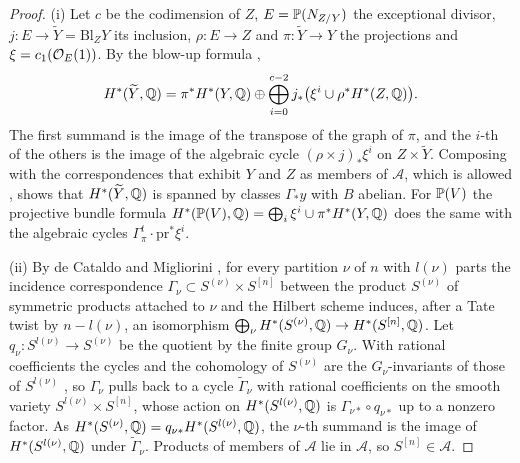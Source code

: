 \begin{proof}
(i) Let $c$ be the codimension of $Z$, $E=\mathbb{P}(N_{Z/Y})$ the exceptional
divisor, $j\colon E\to\widetilde Y=\mathrm{Bl}_{Z}Y$ its inclusion,
$\rho\colon E\to Z$ and $\pi\colon\widetilde Y\to Y$ the projections and
$\xi=c_{1}(\mathcal{O}_{E}(1))$. By the blow-up formula \cite[\S7.3.3]{Voi02},
\[
  H^{*}(\widetilde Y,\mathbb{Q})=\pi^{*}H^{*}(Y,\mathbb{Q})\oplus
  \bigoplus_{i=0}^{c-2}j_{*}\bigl(\xi^{i}\cup\rho^{*}H^{*}(Z,\mathbb{Q})\bigr).
\]
The first summand is the image of the transpose of the graph of $\pi$, and
the $i$-th of the others is the image of the algebraic cycle
$(\rho\times j)_{*}\xi^{i}$ on $Z\times\widetilde Y$. Composing with the
correspondences that exhibit $Y$ and $Z$ as members of $\mathcal{A}$, which is
allowed \cite[Chapter~16]{Ful98}, shows that $H^{*}(\widetilde Y,\mathbb{Q})$ is
spanned by classes $\Gamma_{*}y$ with $B$ abelian. For $\mathbb{P}(V)$ the
projective bundle formula $H^{*}(\mathbb{P}(V),\mathbb{Q})=\bigoplus_{i}\xi^{i}\cup
\pi^{*}H^{*}(Y,\mathbb{Q})$ \cite[\S7.3.3]{Voi02} does the same with the
algebraic cycles $\Gamma_{\pi}^{t}\cdot\mathrm{pr}^{*}\xi^{i}$.

(ii) By de Cataldo and Migliorini \cite{dCM02}, for every partition $\nu$ of
$n$ with $l(\nu)$ parts the incidence correspondence
$\Gamma_{\nu}\subset S^{(\nu)}\times S^{[n]}$ between the product
$S^{(\nu)}$ of symmetric products attached to $\nu$ and the Hilbert scheme
induces, after a Tate twist by $n-l(\nu)$, an isomorphism
$\bigoplus_{\nu}H^{*}(S^{(\nu)},\mathbb{Q})\to H^{*}(S^{[n]},\mathbb{Q})$. Let
$q_{\nu}\colon S^{l(\nu)}\to S^{(\nu)}$ be the quotient by the finite group
$G_{\nu}$. With rational coefficients the cycles and the cohomology of
$S^{(\nu)}$ are the $G_{\nu}$-invariants of those of $S^{l(\nu)}$
\cite[Example~1.7.6]{Ful98}, so $\Gamma_{\nu}$ pulls back to a cycle
$\widetilde\Gamma_{\nu}$ with rational coefficients on the smooth variety
$S^{l(\nu)}\times S^{[n]}$, whose action on $H^{*}(S^{l(\nu)},\mathbb{Q})$ is
$\Gamma_{\nu*}\circ q_{\nu*}$ up to a nonzero factor. As
$H^{*}(S^{(\nu)},\mathbb{Q})=q_{\nu*}H^{*}(S^{l(\nu)},\mathbb{Q})$, the $\nu$-th summand
is the image of $H^{*}(S^{l(\nu)},\mathbb{Q})$ under $\widetilde\Gamma_{\nu}$. Products of members of $\mathcal{A}$ lie in
$\mathcal{A}$, so $S^{[n]}\in\mathcal{A}$.


\end{proof}
